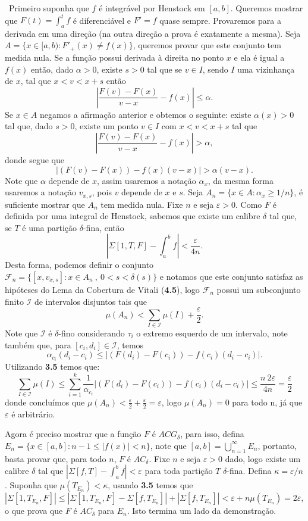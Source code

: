 \documentclass[12pt, a4paper]{article}
\def\dem{\par\smallbreak\noindent {\textit{ Demonstração:}} \ }
\theoremstyle{definition}
\begin{document}
\dem Primeiro suponha que $f$ é integrável por Henstock em $[a,b]$. Queremos mostrar que $F(t)=\int_a^t f$ é diferenciável e $F'=f$ quase sempre. Provaremos para a derivada em uma direção (na outra direção a prova é exatamente a mesma). Seja $A=\{x\in [a,b): F'_+(x)\neq f(x)\}$, queremos provar que este conjunto tem medida nula. Se a função possui derivada à direita no ponto $x$ e ela é igual a $f(x)$ então, dado $\alpha > 0$, existe $s>0$ tal que se $v\in I$, sendo $I$ uma vizinhança de $x$, tal que $x<v<x+s$ então $$\left| \frac{F(v)-F(x)}{v-x} -f(x) \right| \leq \alpha.$$ Se $x\in A$ negamos a afirmação anterior e obtemos o seguinte: existe $\alpha(x)>0$ tal que, dado $s>0$, existe um ponto $v\in I$ com $x<v<x+s$ tal que $$\left| \frac{F(v)-F(x)}{v-x} -f(x) \right| > \alpha,$$ donde segue que $$\left| (F(v)-F(x))  -f(x)(v-x) \right| > \alpha (v-x).$$ Note que $\alpha$ depende de $x$, assim usaremos a notação $\alpha_x$, da mesma forma usaremos a notação $v_{x,s}$, pois $v$ depende de $x$ e $s$. Seja $A_n=\{ x\in A: \alpha_x \geq 1/n \}$, é suficiente mostrar que $A_n$ tem medida nula. Fixe $n$ e seja $\varepsilon > 0$. Como $F$ é definida por uma integral de Henstock, sabemos que existe um calibre $\delta$ tal que, se $T$ é uma partição $\delta$-fina, então $$\left| \Sigma[1,T,F] - \int_a^b f \right|<\frac{\varepsilon }{4n}.$$ Desta forma, podemos definir o conjunto $\mathcal{F}_n = \{  [x,v_{x,s}] : x\in A_n  \ , \ 0 <s<\delta(s) \}$ e notamos que este conjunto satisfaz as hipóteses do Lema da Cobertura de Vitali (\textbf{4.5}), logo $\mathcal{F}_n$ possui um subconjunto finito $\mathcal{I}$ de intervalos disjuntos tais que $$\mu(A_n)< \sum_{I\in \mathcal{I}} \mu(I)+\frac{\varepsilon}{2} . $$ Note que $\mathcal{I}$ é $\delta$-fino considerando $\tau_i$ o extremo esquerdo de um intervalo, note também que, para $[c_i,d_i]\in \mathcal{I}$, temos $$\alpha_{c_i}(d_i - c_i)\leq \left| (F(d_i)-F(c_i))  -f(c_i)(d_i-c_i) \right| . $$ Utilizando \textbf{3.5} temos que: $$\sum_{I\in \mathcal{I}}\mu(I) \leq \sum_{i=1}^k \frac{1}{\alpha_{c_i}} \left| (F(d_i)-F(c_i))  -f(c_i)(d_i-c_i) \right| \leq \frac{n \ 2 \varepsilon}{4n}= \frac{\varepsilon}{2}$$ donde concluímos que $\mu(A_n)< \frac{\varepsilon}{2} + \frac{\varepsilon}{2} = \varepsilon$, logo $\mu(A_n)=0$ para todo n, já que $\varepsilon$ é arbitrário. 

Agora é preciso mostrar que a função $F$ é $ACG_\delta$, para isso, defina $E_n=\{ x\in [a,b]: n-1 \leq |f(x)| < n \}$, note que $[a,b]=\bigcup_{n=1}^\infty E_n$, portanto, basta provar que, para todo $n$, $F$ é  $AC_\delta$. Fixe $n$ e seja $\varepsilon > 0$ dado, logo existe um calibre $\delta$ tal que  $\left| \Sigma[f,T] - \int_a^b f \right|<\varepsilon$ para toda partição $T$ $\delta$-fina. Defina $\kappa=\varepsilon / n$. Suponha que $\mu(T_{E_n})< \kappa$, usando \textbf{3.5} temos que $$\left| \Sigma[1,T_{E_n},F] \right|\leq \left| \Sigma[1,T_{E_n},F] - \Sigma[f,T_{E_n}]\right|+ |\Sigma[f,T_{E_n}]|<\varepsilon + n\mu(T_{E_n})=2\varepsilon,$$ o que prova que $F$ é $AC_\delta$ para $E_n$. Isto termina um lado da demonstração. 
\end{document}
